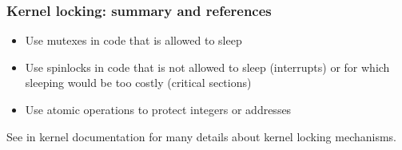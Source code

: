 \begin{frame}
  \frametitle{Kernel locking: summary and references}
  \begin{itemize}
  \item Use mutexes in code that is allowed to sleep
  \item Use spinlocks in code that is not allowed to sleep (interrupts)
    or for which sleeping would be too costly (critical sections)
  \item Use atomic operations to protect integers or addresses
  \end{itemize}
  See  in kernel documentation
  for many details about kernel locking mechanisms.
\end{frame}
